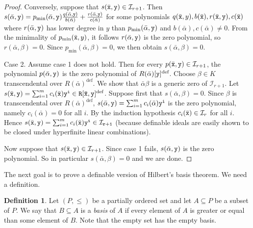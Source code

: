 \documentclass{amsart}
\newcommand{\ca}{\mathcal}
\newcommand{\ideal}[1]{\ca #1}
\theoremstyle{plain}
\theoremstyle{definition}
\newtheorem{defn}[thm]{Definition}
\begin{document}
\begin{proof}
Conversely, suppose that $s(\bar {\tt x}, {\tt y}) \in \ideal I_{r+1}$. Then
$s(\bar \alpha, {\tt y}) = p_{\min}(\bar \alpha, {\tt y}) \frac {q(\bar \alpha, {\tt y})}{b(\bar \alpha)}  + \frac{r(\bar \alpha, {\tt y})}{c(\bar \alpha)}$ for some polynomials $q(\bar {\tt x},y), b(\bar {\tt x}), r(\bar {\tt x}, {\tt y}), c(\bar {\tt x})$ where $r(\bar \alpha, {\tt y})$ has lower degree in $y$ than $p_{\min}(\bar \alpha, {\tt y})$ and $b(\bar \alpha), c(\bar \alpha) \neq 0$. From the minimality of $p_{\min}(\bar {\tt x},y)$, it follows $r(\bar \alpha, {\tt y})$ is the zero polynomial, so $r(\bar \alpha, \beta) = 0$. Since $p_{\min}(\bar \alpha, \beta)=0$, we then obtain $s(\bar \alpha, \beta) = 0$. 

\smallskip
Case 2. Assume case 1 does not hold. Then for every $p(\bar {\tt x}, {\tt y})\in \ideal I_{r+1}$, the polynomial $p(\bar \alpha, {\tt y})$ is the zero polynomial of $R(\bar \alpha)[\tt y]^{\text{def}}$. Choose $\beta\in K$ transcendental over $R(\bar \alpha)^{\text{def}}$. We show that $\bar \alpha \beta$ is a generic zero of ${\ideal I}_{r+1}$. Let $s(\bar {\tt x}, {\tt y}) = \sum_{i=1}^m c_i(\bar {\tt x}) \tt y^i \in R[\bar {\tt x}, \tt y]^{\text{def}}$. 
Suppose first that $s(\bar \alpha, \beta) = 0$. Since $\beta$ is transcendental over $R(\bar \alpha)^{\text{def}}$,  $s(\bar \alpha, {\tt y}) = \sum_{i=1}^m c_i(\bar \alpha) \tt y^i$ is the zero polynomial, namely $c_i(\bar \alpha) = 0$ for all $i$. By the induction hypothesis $c_i(\bar {\tt x}) \in {\ideal I}_r$ for all $i$. Hence $s(\bar {\tt x}, {\tt y}) = \sum_{i=1}^m c_i(\bar {\tt x}) \tt y^i \in \ideal I_{r+1}$ (because definable ideals are easily shown to be closed under hyperfinite linear combinations). 

Now suppose that $s(\bar {\tt x}, {\tt y})\in \ideal I_{r+1}$. Since case 1 fails, $s(\bar \alpha, {\tt y})$ is the zero polynomial. So in particular $s(\bar \alpha, \beta) = 0$ and we are done. 
\end{proof}

The next goal is to  prove a definable version of Hilbert's basis theorem. We need a definition. 
 
\begin{defn} Let $(P,\leq)$ be a partially ordered set and let $A \subseteq P$ be a subset of $P$. 
We say that $B\subseteq A$ is a {\em basis} of $A$ if every element of $A$ is greater or equal than some element of $B$. Note that the empty set has the empty basis.
\end{defn}
\end{document}
